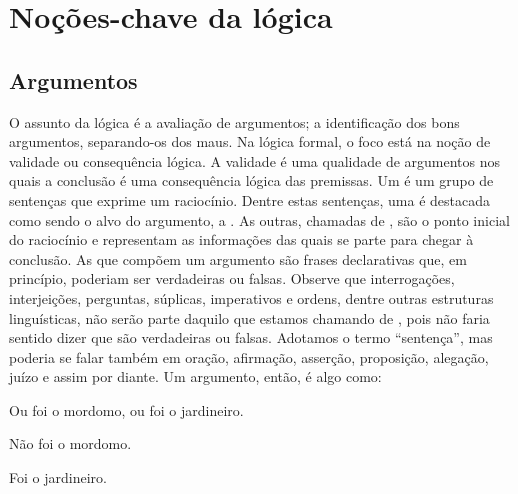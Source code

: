 \part{Noções-chave da lógica}
\label{ch.intro}


\chapter{Argumentos}
\label{s:Arguments}




O assunto da lógica é a avaliação de argumentos; a identificação dos bons argumentos, separando-os dos maus.
Na lógica formal, o foco está na noção de validade ou consequência lógica.
A validade é uma qualidade de argumentos nos quais a conclusão é uma consequência lógica das premissas.
Um  é um grupo de sentenças que exprime um raciocínio.
Dentre estas sentenças, uma é destacada como sendo o alvo do argumento, a .
As outras, chamadas de , são o ponto inicial do raciocínio e representam as informações das quais se parte para chegar à conclusão.
As  que compõem um argumento são frases declarativas que, em princípio, poderiam ser verdadeiras ou falsas.
Observe que interrogações, interjeições, perguntas, súplicas, imperativos e ordens, dentre outras estruturas linguísticas, não serão parte daquilo que estamos chamando de , pois não faria sentido dizer que são verdadeiras ou falsas.
Adotamos o termo ``sentença'', mas poderia se falar também em oração, afirmação, asserção, proposição, alegação, juízo e assim por diante.
Um argumento, então, é algo como:

	\begin{earg}\label{argButlerGardner}
		\item[] Ou foi o mordomo, ou foi o jardineiro.
		\item[] Não foi o mordomo.
		\item[\therefore] Foi o jardineiro.
	\end{earg}
	
